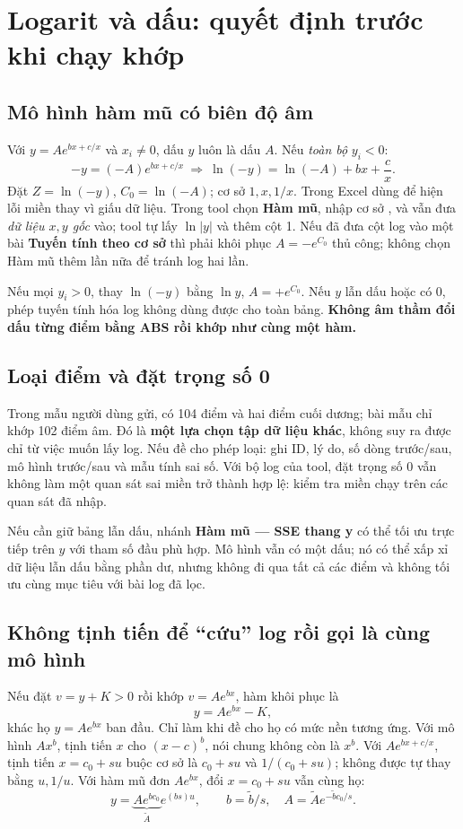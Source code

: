 \documentclass[11pt,a4paper]{article}
\newcommand{\xl}[1]{{\ttfamily\small\detokenize{#1}}}
\begin{document}
\section{Logarit và dấu: quyết định trước khi chạy khớp}
\subsection{Mô hình hàm mũ có biên độ âm}
Với $y=Ae^{bx+c/x}$ và $x_i\ne0$, dấu $y$ luôn là dấu $A$.
Nếu \emph{toàn bộ} $y_i<0$:
\[
-y=(-A)e^{bx+c/x}
\ \Longrightarrow\ \ln(-y)=\ln(-A)+bx+\frac cx.
\]
Đặt $Z=\ln(-y)$, $C_0=\ln(-A)$; cơ sở $1,x,1/x$.
Trong Excel dùng \xl{=IF(C2<0,LN(-C2),NA())} để hiện lỗi miền thay vì giấu dữ liệu.
Trong tool chọn \textbf{Hàm mũ}, nhập cơ sở \xl{x;1/x}, và vẫn đưa \emph{dữ liệu $x,y$ gốc} vào; tool tự lấy $\ln|y|$ và thêm cột 1.
Nếu đã đưa cột log vào một bài \textbf{Tuyến tính theo cơ sở} thì phải khôi phục $A=-e^{C_0}$ thủ công; không chọn Hàm mũ thêm lần nữa để tránh log hai lần.

Nếu mọi $y_i>0$, thay $\ln(-y)$ bằng $\ln y$, $A=+e^{C_0}$.
Nếu $y$ lẫn dấu hoặc có 0, phép tuyến tính hóa log không dùng được cho toàn bảng.
\textbf{Không âm thầm đổi dấu từng điểm bằng ABS rồi khớp như cùng một hàm.}

\subsection{Loại điểm và đặt trọng số 0}
Trong mẫu người dùng gửi, có 104 điểm và hai điểm cuối dương; bài mẫu chỉ khớp 102 điểm âm.
Đó là \textbf{một lựa chọn tập dữ liệu khác}, không suy ra được chỉ từ việc muốn lấy log.
Nếu đề cho phép loại: ghi ID, lý do, số dòng trước/sau, mô hình trước/sau và mẫu tính sai số.
Với bộ log của tool, đặt trọng số 0 vẫn không làm một quan sát sai miền trở thành hợp lệ: kiểm tra miền chạy trên các quan sát đã nhập.

Nếu cần giữ bảng lẫn dấu, nhánh \textbf{Hàm mũ — SSE thang y} có thể tối ưu trực tiếp trên $y$ với tham số đầu phù hợp.
Mô hình vẫn có một dấu; nó có thể xấp xỉ dữ liệu lẫn dấu bằng phần dư, nhưng không đi qua tất cả các điểm và không tối ưu cùng mục tiêu với bài log đã lọc.

\subsection{Không tịnh tiến để ``cứu'' log rồi gọi là cùng mô hình}
Nếu đặt $v=y+K>0$ rồi khớp $v=Ae^{bx}$, hàm khôi phục là
\[
y=Ae^{bx}-K,
\]
khác họ $y=Ae^{bx}$ ban đầu. Chỉ làm khi đề cho họ có mức nền tương ứng.
Với mô hình $A x^b$, tịnh tiến $x$ cho $(x-c)^b$, nói chung không còn là $x^b$.
Với $Ae^{bx+c/x}$, tịnh tiến $x=c_0+su$ buộc cơ sở là $c_0+su$ và $1/(c_0+su)$; không được tự thay bằng $u,1/u$.
Với hàm mũ đơn $Ae^{bx}$, đổi $x=c_0+su$ vẫn cùng họ:
\[
y=\underbrace{Ae^{bc_0}}_{\widetilde A}e^{(bs)u},\qquad
b=\widetilde b/s,\quad A=\widetilde A e^{-\widetilde b c_0/s}.
\]
\end{document}
